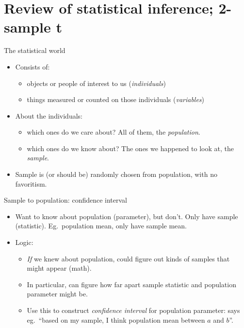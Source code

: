 \section{Review of statistical inference; 2-sample t}
\frame{\sectionpage}





\begin{frame}{The statistical world}
  \begin{itemize}
  \item 
  Consists of:

  \begin{itemize}
  \item objects or people of interest to us ({\em individuals})
  \item things measured or counted on those individuals ({\em variables})
  \end{itemize}

\pause

\item About the individuals:

\begin{itemize}
\item which ones do we care about? All of them, the {\em population}.
\item which ones do we know about? The ones we happened to look at, the {\em sample}.
\end{itemize}

\pause

\item Sample is (or should be) randomly chosen from population, with no favoritism.
  \end{itemize}

\end{frame}

\begin{frame}{Sample to population: confidence interval}
  
  \begin{itemize}
  \item 
Want to know about population (parameter), but don't. Only have sample (statistic). Eg.\ population mean, only have sample mean.
\item Logic:
  \begin{itemize}
  \item {\em If} we knew about population, could figure out kinds of samples that might appear (math).
  \item In particular, can figure how far apart sample statistic and population parameter might be.
  \item Use this to construct {\em confidence interval} for population parameter: says eg.\ ``based on my sample, I think population mean between $a$ and $b$''. 
  \end{itemize}
\end{itemize}
\end{frame}


